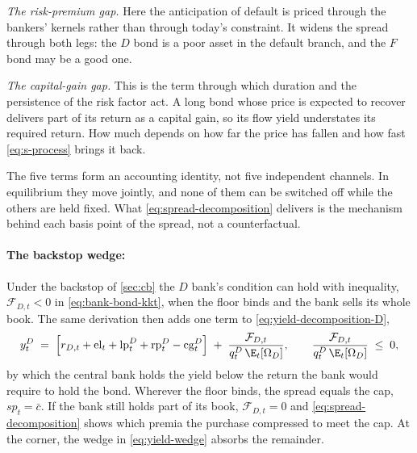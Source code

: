 \emph{The risk-premium gap.} Here the anticipation of default is priced through
the bankers' kernels rather than through today's constraint. It widens the
spread through both legs: the $D$ bond is a poor asset in the default branch,
and the $F$ bond may be a good one.

\emph{The capital-gain gap.} This is the term through which duration and the
persistence of the risk factor act. A long bond whose price is expected to
recover delivers part of its return as a capital gain, so its flow yield
understates its required return. How much depends on how far the price has
fallen and how fast \eqref{eq:s-process} brings it back.

The five terms form an accounting identity, not five independent channels. In
equilibrium they move jointly, and none of them can be switched off while the
others are held fixed.  What \eqref{eq:spread-decomposition} delivers is the
mechanism behind each basis point of the spread, not a counterfactual.

\paragraph{The backstop wedge:}
Under the backstop of \cref{sec:cb} the $D$ bank's condition can hold with
inequality, $\mathcal{F}_{D,t}<0$ in \eqref{eq:bank-bond-kkt}, when the floor
binds and the bank sells its whole book. The same derivation then adds one term
to \eqref{eq:yield-decomposition-D},
\begin{equation}
y^{D}_t\;=\;\Bigl[r_{D,t}+\mathrm{el}_t+\mathrm{lp}^{D}_t+\mathrm{rp}^{D}_t-\mathrm{cg}^{D}_t\Bigr]
\;+\;\frac{\mathcal{F}_{D,t}}{q^{D}_t\,\E_t[\Omega_D]},
\qquad
\frac{\mathcal{F}_{D,t}}{q^{D}_t\,\E_t[\Omega_D]}\;\le\;0 ,
\label{eq:yield-wedge}
\end{equation}
by which the central bank holds the yield below the return the bank would require
to hold the bond. Wherever the floor binds, the spread equals the cap,
$sp_t=\bar c$. If the bank still holds part of its book, $\mathcal{F}_{D,t}=0$ and
\eqref{eq:spread-decomposition} shows which premia the purchase compressed to
meet the cap. At the corner, the wedge in \eqref{eq:yield-wedge} absorbs the
remainder.
